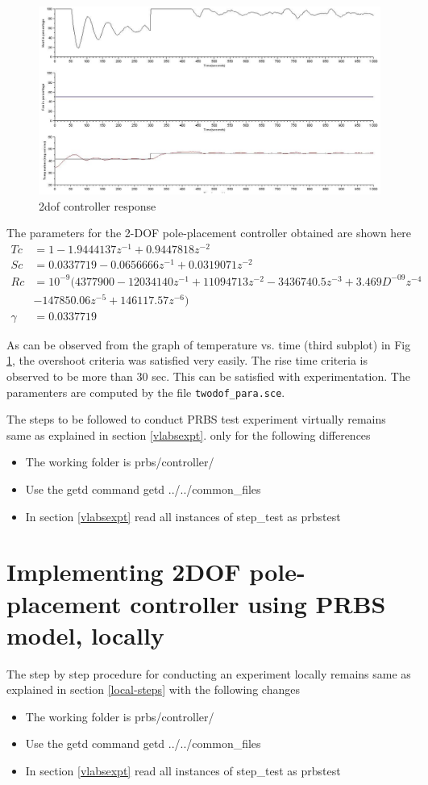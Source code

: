 \begin{figure}
\centering
\includegraphics[width=0.9\linewidth]{prbs/prbs-2dof-controller.png}
\caption{2dof controller response}
\label{2dof-controller}
\end{figure}

 The parameters for the 2-DOF pole-placement controller obtained are shown here
\begin{align*}
Tc &= 1 - 1.9444137 z^{ -1} + 0.9447818 z^{ -2}\\
Sc &= 0.0337719 - 0.0656666z^{ -1}+ 0.0319071z^ { -2}\\
Rc &= 10^{-9} (4377900 - 12034140 z^{ -1} + 11094713 z^ {-2} - 3436740.5 z^{-3} + 3.469D^{-09} z ^{-4} \\&- 147850.06 z^ {-5} + 146117.57 z^{ -6} )\\
\gamma &= 0.0337719
\end{align*}

As can be observed from the graph of temperature vs. time (third subplot) in Fig \ref{2dof-controller}, the overshoot criteria was satisfied very easily. The rise time criteria is observed to be more than 30 sec. This can be satisfied with experimentation.
The paramenters are computed by the file {\tt twodof\_para.sce}.  

The steps to be followed to conduct PRBS test experiment virtually remains same as explained in section \ref{vlabsexpt}. only for the following differences
\begin{itemize}
\item The working folder is prbs/controller/
\item Use the getd command getd ../../common\_files
\item In section \ref{vlabsexpt} read all instances of step\_test as prbstest
\end{itemize}

\section{Implementing 2DOF pole-placement controller using PRBS model, locally}
The step by step procedure for conducting an experiment locally remains same as explained in section \ref{local-steps} with the following changes
\begin{itemize}
\item The working folder is prbs/controller/
\item Use the getd command getd ../../common\_files
\item In section \ref{vlabsexpt} read all instances of step\_test as prbstest
\end{itemize}

